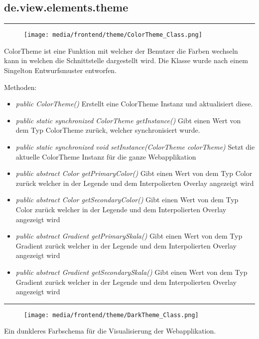 \begin{itemize}
\subsection{de.view.elements.theme}

\rule{\textwidth}{0.4pt} 
\begin{minipage}{0.3\textwidth}
    \begin{figure}[H]
        \texttt{[image: media/frontend/theme/ColorTheme\_Class.png]}
    \end{figure}
    \end{minipage} \hfill
    \begin{minipage}{0.6\textwidth}
ColorTheme ist eine Funktion mit welcher der Benutzer die Farben wechseln kann in welchen die Schnittstelle dargestellt wird. Die Klasse wurde nach einem Singelton Entwurfsmuster entworfen.
\end{minipage}

Methoden:
\begin{itemize} 
    \item \emph{public ColorTheme()} Erstellt eine ColorTheme Instanz und aktualisiert diese.
    \item \emph{public static synchronized ColorTheme getInstance()} Gibt einen Wert von dem Typ ColorTheme zurück, welcher synchronisiert wurde.
    \item \emph{public static synchronized void setInstance(ColorTheme colorTheme)} Setzt die aktuelle ColorTheme Instanz für die ganze Webapplikation
    \item \emph{public abstract Color getPrimaryColor()} Gibt einen Wert von dem Typ Color zurück welcher in der Legende und dem Interpolierten Overlay angezeigt wird
    \item \emph{public abstract Color getSecondaryColor()} Gibt einen Wert von dem Typ Color zurück welcher in der Legende und dem Interpolierten Overlay angezeigt wird
    \item \emph{public abstract Gradient getPrimarySkala()} Gibt einen Wert von dem Typ Gradient zurück welcher in der Legende und dem Interpolierten Overlay angezeigt wird
    \item \emph{public abstract Gradient getSecondarySkala()}  Gibt einen Wert von dem Typ Gradient zurück welcher in der Legende und dem Interpolierten Overlay angezeigt wird
\end{itemize}

\rule{\textwidth}{0.4pt} 
\begin{minipage}{0.3\textwidth}
    \begin{figure}[H]
        \texttt{[image: media/frontend/theme/DarkTheme\_Class.png]}
    \end{figure}
    \end{minipage} \hfill
    \begin{minipage}{0.6\textwidth}
       Ein dunkleres Farbschema für die Visualisierung der Webapplikation.
    \end{minipage}


\end{itemize}
